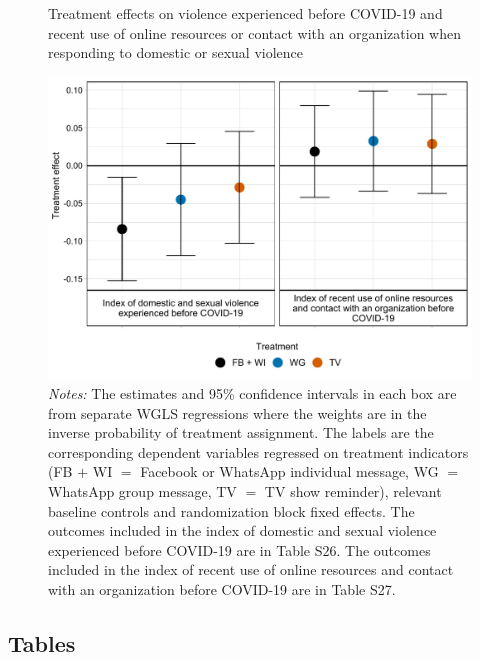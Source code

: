 \documentclass[12pt]{article}
\begin{document}
\begin{figure}[H]
    \centering
    \caption{Treatment effects on violence experienced before COVID-19 and recent use of online resources or contact with an organization when responding to domestic or sexual violence}
    \includegraphics[width=12cm, height=9cm\textwidth]{Figures/RF-FS/FigureA2.pdf}
        \captionsetup{width=.75\linewidth}
    \caption*{\footnotesize \textit{Notes:} The estimates and 95\% confidence intervals in each box are from separate WGLS regressions where the weights are in the inverse probability of treatment assignment. The labels are the corresponding dependent variables regressed on treatment indicators (FB $+$ WI $=$ Facebook or WhatsApp individual message, WG $=$ WhatsApp group message, TV $=$ TV show reminder), relevant baseline controls and randomization block fixed effects. The outcomes included in the index of domestic and sexual violence experienced before COVID-19 are in Table S$26$. The outcomes included in the index of recent use of online resources and contact with an organization before COVID-19 are in Table S27.}
\end{figure}




\subsection*{Tables}
\setcounter{table}{0}
\renewcommand{\thetable}{S\arabic{table}}
\end{document}
